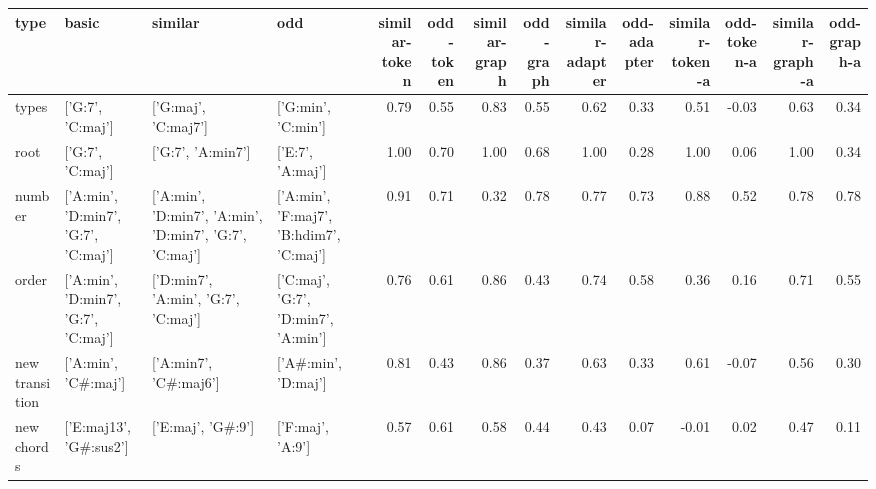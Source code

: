 \begin{tabular}{llllrrrrrrrrrr}
\toprule
type & basic & similar & odd & similar-token & odd-token & similar-graph & odd-graph & similar-adapter & odd-adapter & similar-token-a & odd-token-a & similar-graph-a & odd-graph-a \\
\midrule
types & ['G:7', 'C:maj'] & ['G:maj', 'C:maj7'] & ['G:min', 'C:min'] & 0.79 & 0.55 & 0.83 & 0.55 & 0.62 & 0.33 & 0.51 & -0.03 & 0.63 & 0.34 \\
root & ['G:7', 'C:maj'] & ['G:7', 'A:min7'] & ['E:7', 'A:maj'] & 1.00 & 0.70 & 1.00 & 0.68 & 1.00 & 0.28 & 1.00 & 0.06 & 1.00 & 0.34 \\
number & ['A:min', 'D:min7', 'G:7', 'C:maj'] & ['A:min', 'D:min7', 'A:min', 'D:min7', 'G:7', 'C:maj'] & ['A:min', 'F:maj7', 'B:hdim7', 'C:maj'] & 0.91 & 0.71 & 0.32 & 0.78 & 0.77 & 0.73 & 0.88 & 0.52 & 0.78 & 0.78 \\
order & ['A:min', 'D:min7', 'G:7', 'C:maj'] & ['D:min7', 'A:min', 'G:7', 'C:maj'] & ['C:maj', 'G:7', 'D:min7', 'A:min'] & 0.76 & 0.61 & 0.86 & 0.43 & 0.74 & 0.58 & 0.36 & 0.16 & 0.71 & 0.55 \\
new transition & ['A:min', 'C\#:maj'] & ['A:min7', 'C\#:maj6'] & ['A\#:min', 'D:maj'] & 0.81 & 0.43 & 0.86 & 0.37 & 0.63 & 0.33 & 0.61 & -0.07 & 0.56 & 0.30 \\
new chords & ['E:maj13', 'G\#:sus2'] & ['E:maj', 'G\#:9'] & ['F:maj', 'A:9'] & 0.57 & 0.61 & 0.58 & 0.44 & 0.43 & 0.07 & -0.01 & 0.02 & 0.47 & 0.11 \\
\bottomrule
\end{tabular}
